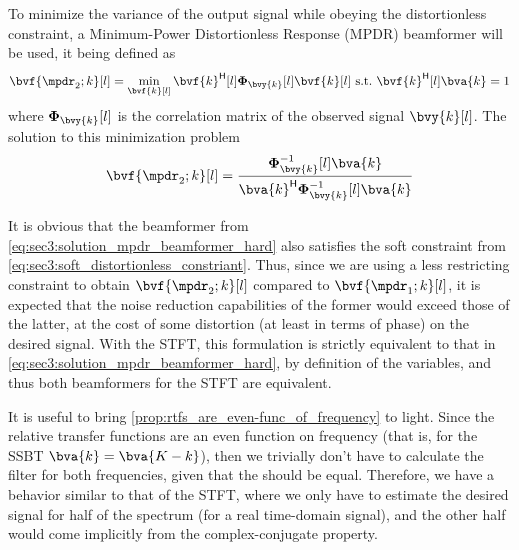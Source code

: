 To minimize the variance of the output signal while obeying the distortionless constraint, a Minimum-Power Distortionless Response (MPDR) beamformer will be used, it being defined as
\begin{equation}
	\label{eq:sec3:minimization_problem_mpdr_soft}
	\bvf{\mpdr_2;k}[l] = \min_{\bvf{k}[l]} \he{\bvf{k}}[l] \Corr{\bvy{k}}[l] \bvf{k}[l]~\text{s.t.}~\he{\bvf{k}}[l] \bva{k} = 1
\end{equation}
where $\Corr{\bvy{k}}[l]$ is the correlation matrix of the observed signal $\bvy{k}[l]$. The solution to this minimization problem 
\begin{equation}
	\label{eq:sec3:solution_mpdr_beamformer_soft}
	\bvf{\mpdr_2;k}[l] = \frac{\iCorr{\bvy{k}}[l] \bva{k}}{ \he{\bva{k}} \iCorr{\bvy{k}}[l] \bva{k} }
\end{equation}

It is obvious that the beamformer from \cref{eq:sec3:solution_mpdr_beamformer_hard} also satisfies the soft constraint from \cref{eq:sec3:soft_distortionless_constriant}. Thus, since we are using a less restricting constraint to obtain $\bvf{\mpdr_2;k}[l]$ compared to $\bvf{\mpdr_1;k}[l]$, it is expected that the noise reduction capabilities of the former would exceed those of the latter, at the cost of some distortion (at least in terms of phase) on the desired signal. With the STFT, this formulation is strictly equivalent to that in \cref{eq:sec3:solution_mpdr_beamformer_hard}, by definition of the variables, and thus both beamformers for the STFT are equivalent.

It is useful to bring \cref{prop:rtfs_are_even-func_of_frequency} to light. Since the relative transfer functions are an even function on frequency (that is, for the SSBT $\bva{k} = \bva{K-k}$), then we trivially don't have to calculate the filter for both frequencies, given that the should be equal. Therefore, we have a behavior similar to that of the STFT, where we only have to estimate the desired signal for half of the spectrum (for a real time-domain signal), and the other half would come implicitly from the complex-conjugate property.

